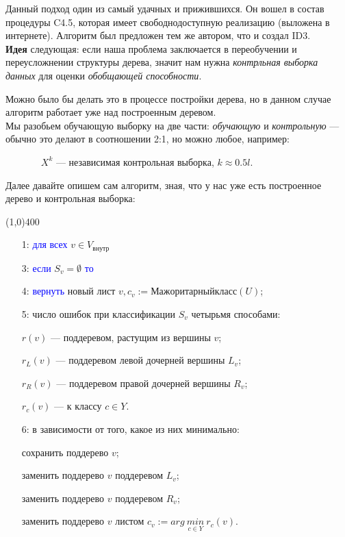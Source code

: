 \documentclass{article}
\begin{document}
Данный подход один из самый удачных и прижившихся. Он вошел в состав процедуры C4.5, которая имеет свободнодоступную реализацию (выложена в интернете). Алгоритм был предложен тем же автором, что и создал ID3.
\\

\textbf{Идея} следующая: если наша проблема заключается в переобучении и переусложнении структуры дерева, значит нам нужна \textit{контрльная выборка данных} для оценки \textit{обобщающей способности}.

Можно было бы делать это в процессе постройки дерева, но в данном случае алгоритм работает уже над построенным деревом.
\\

Мы разобьем обучающую выборку на две части: \textit{обучающую} и \textit{контрольную} --- обычно это делают в соотношении 2:1, но можно любое, например:

\begin{itemize}
\item[] $\qquad X^k$ --- независимая контрольная выборка, $k \approx 0.5l$.
\end{itemize}

Далее давайте опишем сам алгоритм, зная, что у нас уже есть построенное дерево и контрольная выборка:

\begin{center}
\newpage
\line(1,0){400}
\end{center}

\begin{itemize}
\item[1:] \textcolor{blue}{для всех} $v \in V_\text{внутр}$

				

\item[3:] \qquad \textcolor{blue}{если} $S_v = \emptyset$ \textcolor{blue}{то}

\item[4:] \qquad \qquad \textcolor{blue}{вернуть}
				новый лист $v, c_v := Мажоритарный класс(U)$;
			
\item[5:] \qquad число ошибок при классификации $S_v$ четырьмя способами:
		
			\qquad \qquad $r(v)$ --- поддеревом, растущим из вершины $v$;
			
			\qquad \qquad $r_L(v)$ --- поддеревом левой дочерней вершины $L_v$;
			
			\qquad \qquad $r_R(v)$ --- поддеревом правой дочерней вершины $R_v$;

			\qquad \qquad $r_c(v)$ --- к классу $c \in Y$.


\item[6:] \qquad в зависимости от того, какое из них минимально:
		
			\qquad \qquad сохранить поддерево $v$;
			
			\qquad \qquad заменить поддерево $v$ поддеревом $L_v$;
			
			\qquad \qquad заменить поддерево $v$ поддеревом $R_v$;

			\qquad \qquad заменить поддерево $v$ листом
							$c_v := arg\ \underset{c \in Y}{min}\ r_c(v)$.
\end{itemize}
\end{document}
